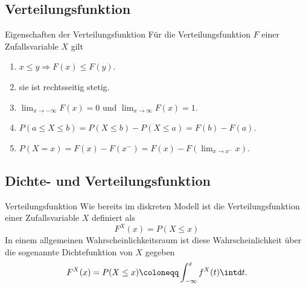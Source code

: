 \subsection{Verteilungsfunktion}


\begin{satz}{Eigenschaften der Verteilungsfunktion}
	Für die Verteilungsfunktion $F$ einer Zufallsvariable $X$ gilt
	\begin{enumerate}
		\item $x\leq y\Rightarrow F(x)\leq F(y)$.
		\item sie ist rechtsseitig stetig.
		\item $\lim_{x\to-\infty}F(x)=0$ und $\lim_{x\to\infty}F(x)=1$.
		\item $P(a\leq X\leq b)=P(X\leq b)-P(X\leq a)=F(b)-F(a)$.
		\item $P(X=x)=F(x)-F(x^-)=F(x)-F(\lim_{x\to x^-} x)$.
	\end{enumerate}
\end{satz}

\subsection{Dichte- und Verteilungsfunktion}

\begin{definition}{Verteilungsfunktion}
	Wie bereits im diskreten Modell ist die Verteilungsfunktion einer Zufallsvariable $X$ definiert als
	\begin{equation*}
		F^X(x) = P(X\leq x)
	\end{equation*}
	In einem allgemeinen Wahrscheinlichkeitsraum ist diese Wahrscheinlichkeit über die sogenannte Dichtefunktion von $X$ gegeben
	\begin{equation*}
		F^X(x)=P(X\leq x)\coloneqq \int_{-\infty}^x f^X(t)\intd t.
	\end{equation*}
\end{definition}

